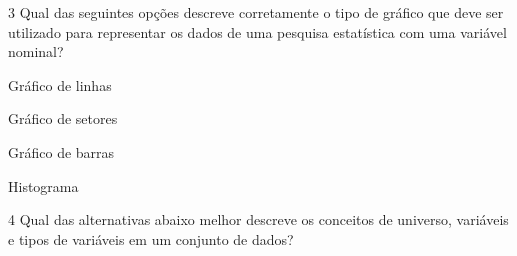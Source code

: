 
\num{3}  Qual das seguintes opções descreve corretamente o tipo de gráfico que
deve ser utilizado para representar os dados de uma pesquisa estatística
com uma variável nominal?

\begin{escolha}
\item Gráfico de linhas
\item Gráfico de setores
\item Gráfico de barras
\item Histograma
\end{escolha}




\num{4}  Qual das alternativas abaixo melhor descreve os conceitos de
universo, variáveis e tipos de variáveis em um conjunto de dados?

